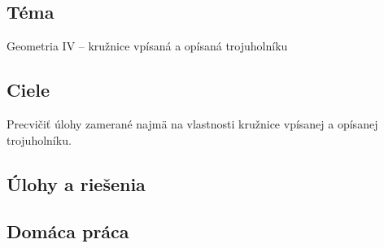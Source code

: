 

\subsection*{Téma}
Geometria IV -- kružnice vpísaná a opísaná trojuholníku

\subsection*{Ciele}
Precvičiť úlohy zamerané najmä na vlastnosti kružnice vpísanej a opísanej trojuholníku.

\subsection*{Úlohy a riešenia}













\subsection*{Domáca práca}






